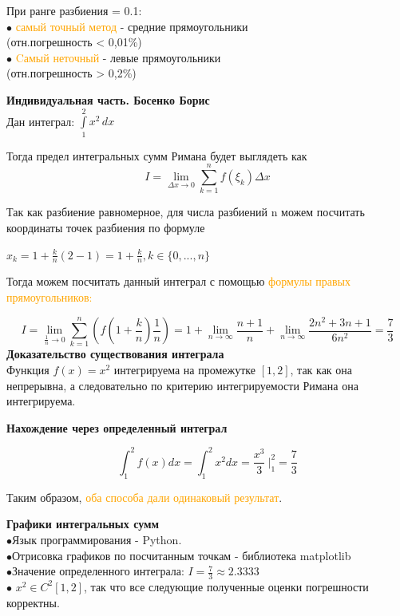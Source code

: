 \documentclass[aspectratio=169]{beamer}
\begin{document}
	При ранге разбиения = 0.1:\\
	$\bullet$ \textcolor{orange}{самый точный метод} - средние прямоугольники\\ (отн.погрешность < 0,01\%)\\
	$\bullet$ \textcolor{orange}{Cамый неточный} - левые прямоугольники\\ (отн.погрешность > 0,2\%)
	
	\newpage
	\large \textbf{\textcolor{structure.fg}{Индивидуальная часть. Босенко Борис}}\\
	
		Дан интеграл:
	\(\int\limits_1^{2} x^2 \, dx\)
	
	Тогда предел интегральных сумм Римана будет выглядеть как 
	\[I = \lim_{\Delta x \to 0} \sum_{k=1}^{n} f(\xi_k)\Delta x \]
	
	Так как разбиение равномерное, для числа разбиений n можем посчитать координаты точек разбиения по формуле
	
	\(x_k = 1 + \frac{k}{n} ( 2 - 1 ) = 1 + \frac{k}{n}, k \in \{0, ..., n\}\)

	Тогда можем посчитать данный интеграл с помощью \textcolor{orange}{формулы правых прямоугольников:}
	
	\[ I = \lim_{\frac{1}{n} \to 0} \sum_{k=1}^{n} \left( f\left(1 + \frac{k}{n}\right) \frac{1}{n} \right) =1 + \lim_{n \to \infty} \frac{n+1}{n} + \lim_{n \to \infty} \frac{2n^2 + 3n + 1}{6n^2} = \frac{7}{3}\]
	\newpage
	\textbf{Доказательство существования интеграла}\\
Функция $f(x) = x^2$ интегрируема на промежутке $[1, 2]$, так как она непрерывна, а следовательно по критерию интегрируемости Римана она интегрируема.
	
	\textbf{Нахождение через определенный интеграл}
	
	\[ \int_{1}^{2} f(x) dx = \int_{1}^{2} x^2 dx = \frac{x^3}{3} \ \bigg|_{1}^{2} = \frac{7}{3}\]
	
	Таким образом, \textcolor{orange}{оба способа дали одинаковый результат}.
	
	\large \textbf{\textcolor{structure.fg}{Графики интегральных сумм}}\\
	$\bullet$Язык программирования - Python.\\
	$\bullet$Отрисовка графиков по посчитанным точкам - библиотека matplotlib\\
	$\bullet$Значение определенного интеграла: \(I=\frac{7}{3}\approx 2.3333\)\\[1cm]
	$\bullet$	\(x^2 \in C^2[1, 2]\), так что все следующие полученные оценки погрешности корректны.
	
\end{document}
